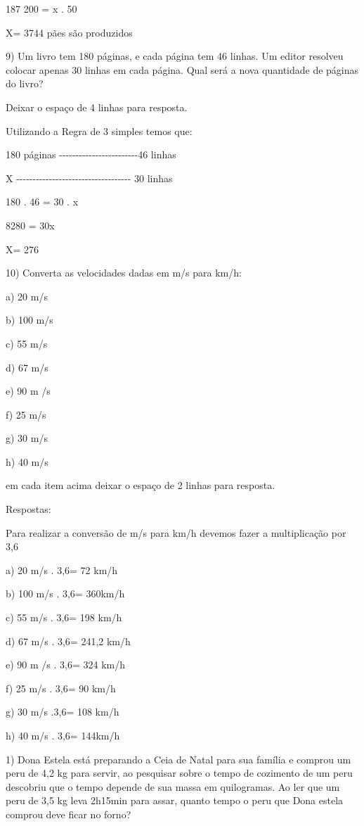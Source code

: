 {187 200 = x . 50

X= 3744 pães são produzidos

9) Um livro tem 180 páginas, e cada página tem 46 linhas. Um editor
resolveu colocar apenas 30 linhas em cada página. Qual será a nova
quantidade de páginas do livro?

Deixar o espaço de 4 linhas para resposta.

Utilizando a Regra de 3 simples temos que:

180 páginas
-\/-\/-\/-\/-\/-\/-\/-\/-\/-\/-\/-\/-\/-\/-\/-\/-\/-\/-\/-\/-\/-\/-\/-46
linhas

X
-\/-\/-\/-\/-\/-\/-\/-\/-\/-\/-\/-\/-\/-\/-\/-\/-\/-\/-\/-\/-\/-\/-\/-\/-\/-\/-\/-\/-\/-\/-\/-\/-\/-\/-
30 linhas

180 . 46 = 30 . x

8280 = 30x

X= 276

10) Converta as velocidades dadas em m/s para km/h:

a) 20 m/s

b) 100 m/s

c) 55 m/s

d) 67 m/s

e) 90 m /s

f) 25 m/s

g) 30 m/s

h) 40 m/s

em cada item acima deixar o espaço de 2 linhas para resposta.

Respostas:

Para realizar a conversão de m/s para km/h devemos fazer a multiplicação
por 3,6

a) 20 m/s . 3,6= 72 km/h

b) 100 m/s . 3,6= 360km/h

c) 55 m/s . 3,6= 198 km/h

d) 67 m/s . 3,6= 241,2 km/h

e) 90 m /s . 3,6= 324 km/h

f) 25 m/s . 3,6= 90 km/h

g) 30 m/s .3,6= 108 km/h

h) 40 m/s . 3,6= 144km/h


1) Dona Estela está preparando a Ceia de Natal para sua família e
comprou um peru de 4,2 kg para servir, ao pesquisar sobre o tempo de
cozimento de um peru descobriu que o tempo depende de sua massa em
quilogramas. Ao ler que um peru de 3,5 kg leva 2h15min para assar,
quanto tempo o peru que Dona estela comprou deve ficar no forno?

}
